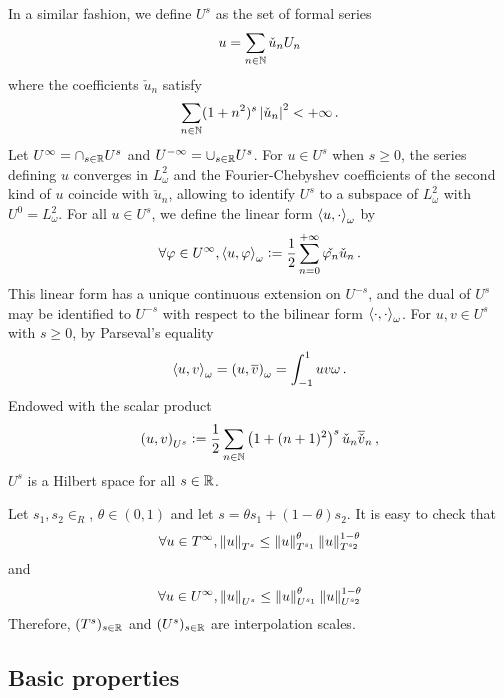 \documentclass[a4paper]{article}
\begin{document}
\begin{Def}
	In a similar fashion, we define $U^{s}$ as the set of formal series 
	\[u = \sum_{n \in \mathbb{N}}\check{u}_n U_n\]
	where the coefficients $\check{u}_n$ satisfy
	\[\sum_{n \in \mathbb{N}} (1 + n^2)^s \left\lvert \check{u}_n \right\rvert^2 < + \infty\,.\]
	Let $U^\infty = \cap_{s \in \mathbb{R}} U^s$ and $U^{-\infty} = \cup_{s \in \mathbb{R}} U^s$. For $u \in U^s$ when $s \geq 0$, the series defining $u$ converges in $L^2_{\omega}$ and the Fourier-Chebyshev coefficients of the second kind of $u$ coincide with $\check{u}_n$, allowing to identify $U^s$ to a subspace of $L^2_{\omega}$ with $U^0 = L^2_\omega$. For all $u \in U^s$, we define the linear form $\left\langle u,\cdot\right\rangle_\omega$ by 
	\begin{equation}
		\label{dualiteUs}
		\forall \varphi \in U^\infty, \left\langle u,\varphi\right\rangle_\omega \mathrel{\mathop:}= \frac{1}{2} \sum_{n = 0}^{+ \infty} \check{\varphi_n}\check{u}_n\,.
	\end{equation}
	This linear form has a unique continuous extension on $U^{-s}$, and the dual of $U^s$ may be identified to $U^{-s}$ with respect to the bilinear form $\left\langle \cdot,\cdot\right\rangle_{\omega}$. For $u,v \in U^s$ with $s \geq 0$, by Parseval's equality 
	\[\left\langle u,v\right\rangle_\omega = \left( u,\overline v\right)_\omega = \int_{-1}^{1} uv \omega \,.\]
	Endowed with the scalar product
	\[\left( u,v\right)_{U^s} \mathrel{\mathop:}= \frac{1}{2}\sum_{n \in \mathbb{N}} \left(1 + (n + 1)^2\right)^s \check{u}_n \overline{\check{v}}_n\,,\] 
	$U^s$ is a Hilbert space for all $s \in \mathbb{R}$. 
\end{Def}

Let $s_1,s_2 \in _R$, $\theta \in (0,1)$ and let $s = \theta s_1 + (1-\theta)s_2$. It is easy to check that
\[\forall u \in T^\infty, \left\|u\right\|_{T^s} \leq \left\|u\right\|_{T^{s_1}}^\theta \left\|u\right\|_{T^{s_2}}^{1 - \theta}\]
and 
\[\forall u \in U^\infty, \left\|u\right\|_{U^s} \leq \left\|u\right\|_{U^{s_1}}^\theta \left\|u\right\|_{U^{s_2}}^{1 - \theta}\]
Therefore, $(T^s)_{s \in \mathbb{R}}$ and $(U^s)_{s \in \mathbb{R}}$ are interpolation scales. 

\subsection{Basic properties}
\end{document}
